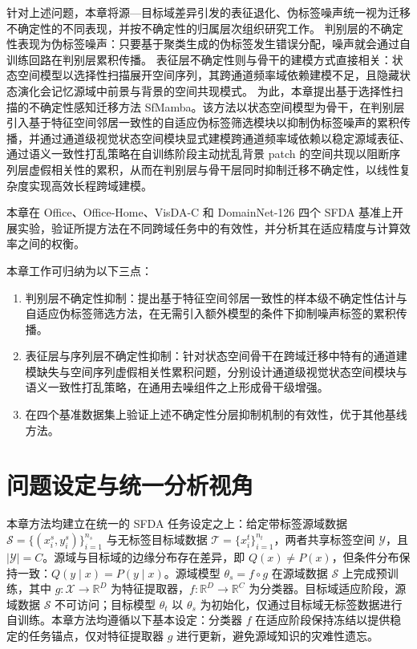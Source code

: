 针对上述问题，本章将源—目标域差异引发的表征退化、伪标签噪声统一视为迁移不确定性的不同表现，并按不确定性的归属层次组织研究工作。
判别层的不确定性表现为伪标签噪声：只要基于聚类生成的伪标签发生错误分配，噪声就会通过自训练回路在判别层累积传播。
表征层不确定性则与骨干的建模方式直接相关：状态空间模型以选择性扫描展开空间序列，其跨通道频率域依赖建模不足，且隐藏状态演化会记忆源域中前景与背景的空间共现模式。
为此，本章提出基于选择性扫描的不确定性感知迁移方法 SfMamba。该方法以状态空间模型为骨干，在判别层引入基于特征空间邻居一致性的自适应伪标签筛选模块以抑制伪标签噪声的累积传播，并通过通道级视觉状态空间模块显式建模跨通道频率域依赖以稳定源域表征、通过语义一致性打乱策略在自训练阶段主动扰乱背景 patch 的空间共现以阻断序列层虚假相关性的累积，从而在判别层与骨干层同时抑制迁移不确定性，以线性复杂度实现高效长程跨域建模。

本章在 Office、Office-Home、VisDA-C 和 DomainNet-126 四个 SFDA 基准上开展实验，验证所提方法在不同跨域任务中的有效性，并分析其在适应精度与计算效率之间的权衡。

本章工作可归纳为以下三点：
\begin{enumerate}
    \item 判别层不确定性抑制：提出基于特征空间邻居一致性的样本级不确定性估计与自适应伪标签筛选方法，在无需引入额外模型的条件下抑制噪声标签的累积传播。
    \item 表征层与序列层不确定性抑制：针对状态空间骨干在跨域迁移中特有的通道建模缺失与空间序列虚假相关性累积问题，分别设计通道级视觉状态空间模块与语义一致性打乱策略，在通用去噪组件之上形成骨干级增强。
    \item 在四个基准数据集上验证上述不确定性分层抑制机制的有效性，优于其他基线方法。
\end{enumerate}

\section{问题设定与统一分析视角}

\label{sec:chap2_problem}

本章方法均建立在统一的 SFDA 任务设定之上：给定带标签源域数据 $\mathcal{S} = \{(x_i^s, y_i^s)\}_{i=1}^{n_s}$ 与无标签目标域数据 $\mathcal{T} = \{x_i^t\}_{i=1}^{n_t}$，两者共享标签空间 $\mathcal{Y}$，且 $|\mathcal{Y}| = C$。源域与目标域的边缘分布存在差异，即 $Q(x) \neq P(x)$，但条件分布保持一致：$Q(y \mid x) = P(y \mid x)$。源域模型 $\theta_s = f \circ g$ 在源域数据 $\mathcal{S}$ 上完成预训练，其中 $g: \mathcal{X} \to \mathbb{R}^D$ 为特征提取器，$f: \mathbb{R}^D \to \mathbb{R}^C$ 为分类器。目标域适应阶段，源域数据 $\mathcal{S}$ 不可访问；目标模型 $\theta_t$ 以 $\theta_s$ 为初始化，仅通过目标域无标签数据进行自训练。本章方法均遵循以下基本设定：分类器 $f$ 在适应阶段保持冻结以提供稳定的任务锚点，仅对特征提取器 $g$ 进行更新，避免源域知识的灾难性遗忘。

